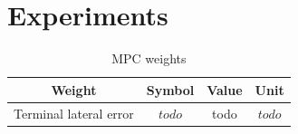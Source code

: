 \documentclass[a4paper, onecolumn, 12pt]{article}
\begin{document}
\newpage
\section{Experiments}


\begin{table}[H] 
    \centering
    \caption{MPC weights} \label{weights}
    \begin{tabular}{ |c|c|c|c| }
        \hline
        \textbf{Weight} & \textbf{Symbol} & \textbf{Value} & \textbf{Unit} \\ [0.5ex] 
        \hline
        \hline 
        Terminal lateral error & $todo$ & todo & $todo$\\ 
        \hline
    \end{tabular}
\end{table}
\end{document}
